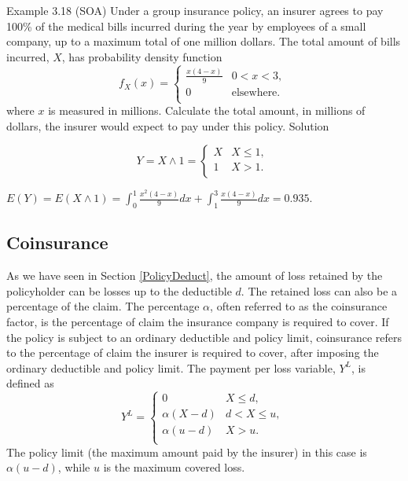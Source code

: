 \documentclass[]{book}
\theoremstyle{definition}
\theoremstyle{definition}
\theoremstyle{definition}
\theoremstyle{remark}
\begin{document}
Example 3.18 (SOA) Under a group insurance policy, an insurer agrees to
pay 100\% of the medical bills incurred during the year by employees of
a small company, up to a maximum total of one million dollars. The total
amount of bills incurred, \(X\), has probability density function
\[f_{X}\left( x \right) = \left\{ \begin{matrix}
\frac{x\left( 4 - x \right)}{9} & 0 < x < 3, \\
0 & \text{elsewhere.} \\
\end{matrix} \right.\ \] where \(x\) is measured in millions. Calculate
the total amount, in millions of dollars, the insurer would expect to
pay under this policy. Solution

\[Y = X \land 1 = \left\{ \begin{matrix}
X & X \leq 1, \\
1 & X > 1. \\
\end{matrix} \right.\ \]

\(E\left( Y \right) = E\left( X \land 1 \right) = \int_{0}^{1}\frac{x^{2}(4 - x)}{9}dx + \int_{1}^{3}\frac{x\left( 4 - x \right)}{9}dx = 0.935\).

\subsection{Coinsurance}\label{coinsurance}

As we have seen in Section \ref{PolicyDeduct}, the amount of loss
retained by the policyholder can be losses up to the deductible \(d\).
The retained loss can also be a percentage of the claim. The percentage
\(\alpha\), often referred to as the coinsurance factor, is the
percentage of claim the insurance company is required to cover. If the
policy is subject to an ordinary deductible and policy limit,
coinsurance refers to the percentage of claim the insurer is required to
cover, after imposing the ordinary deductible and policy limit. The
payment per loss variable, \(Y^{L}\), is defined as
\[Y^{L} = \left\{ \begin{matrix}
0 & X \leq d, \\
\alpha\left( X - d \right) & d <  X \leq u, \\
\alpha\left( u - d \right) & X > u. \\
\end{matrix} \right.\ \] The policy limit (the maximum amount paid by
the insurer) in this case is \(\alpha\left( u - d \right)\), while \(u\)
is the maximum covered loss.
\end{document}
